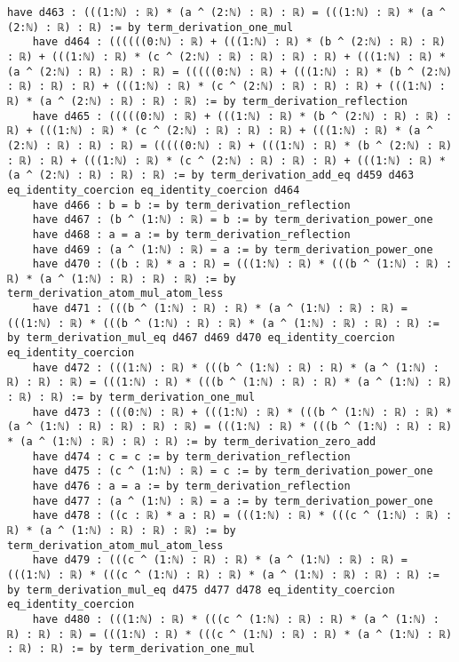\documentclass{article}
\begin{document}
\begin{tcolorbox}[colback=white!10, width=\linewidth]
\begin{lstlisting}[language=Lean4]
    have d463 : (((1:ℕ) : ℝ) * (a ^ (2:ℕ) : ℝ) : ℝ) = (((1:ℕ) : ℝ) * (a ^ (2:ℕ) : ℝ) : ℝ) := by term_derivation_one_mul
    have d464 : ((((((0:ℕ) : ℝ) + (((1:ℕ) : ℝ) * (b ^ (2:ℕ) : ℝ) : ℝ) : ℝ) + (((1:ℕ) : ℝ) * (c ^ (2:ℕ) : ℝ) : ℝ) : ℝ) : ℝ) + (((1:ℕ) : ℝ) * (a ^ (2:ℕ) : ℝ) : ℝ) : ℝ) = (((((0:ℕ) : ℝ) + (((1:ℕ) : ℝ) * (b ^ (2:ℕ) : ℝ) : ℝ) : ℝ) + (((1:ℕ) : ℝ) * (c ^ (2:ℕ) : ℝ) : ℝ) : ℝ) + (((1:ℕ) : ℝ) * (a ^ (2:ℕ) : ℝ) : ℝ) : ℝ) := by term_derivation_reflection
    have d465 : (((((0:ℕ) : ℝ) + (((1:ℕ) : ℝ) * (b ^ (2:ℕ) : ℝ) : ℝ) : ℝ) + (((1:ℕ) : ℝ) * (c ^ (2:ℕ) : ℝ) : ℝ) : ℝ) + (((1:ℕ) : ℝ) * (a ^ (2:ℕ) : ℝ) : ℝ) : ℝ) = (((((0:ℕ) : ℝ) + (((1:ℕ) : ℝ) * (b ^ (2:ℕ) : ℝ) : ℝ) : ℝ) + (((1:ℕ) : ℝ) * (c ^ (2:ℕ) : ℝ) : ℝ) : ℝ) + (((1:ℕ) : ℝ) * (a ^ (2:ℕ) : ℝ) : ℝ) : ℝ) := by term_derivation_add_eq d459 d463 eq_identity_coercion eq_identity_coercion d464
    have d466 : b = b := by term_derivation_reflection
    have d467 : (b ^ (1:ℕ) : ℝ) = b := by term_derivation_power_one
    have d468 : a = a := by term_derivation_reflection
    have d469 : (a ^ (1:ℕ) : ℝ) = a := by term_derivation_power_one
    have d470 : ((b : ℝ) * a : ℝ) = (((1:ℕ) : ℝ) * (((b ^ (1:ℕ) : ℝ) : ℝ) * (a ^ (1:ℕ) : ℝ) : ℝ) : ℝ) := by term_derivation_atom_mul_atom_less
    have d471 : (((b ^ (1:ℕ) : ℝ) : ℝ) * (a ^ (1:ℕ) : ℝ) : ℝ) = (((1:ℕ) : ℝ) * (((b ^ (1:ℕ) : ℝ) : ℝ) * (a ^ (1:ℕ) : ℝ) : ℝ) : ℝ) := by term_derivation_mul_eq d467 d469 d470 eq_identity_coercion eq_identity_coercion
    have d472 : (((1:ℕ) : ℝ) * (((b ^ (1:ℕ) : ℝ) : ℝ) * (a ^ (1:ℕ) : ℝ) : ℝ) : ℝ) = (((1:ℕ) : ℝ) * (((b ^ (1:ℕ) : ℝ) : ℝ) * (a ^ (1:ℕ) : ℝ) : ℝ) : ℝ) := by term_derivation_one_mul
    have d473 : (((0:ℕ) : ℝ) + (((1:ℕ) : ℝ) * (((b ^ (1:ℕ) : ℝ) : ℝ) * (a ^ (1:ℕ) : ℝ) : ℝ) : ℝ) : ℝ) = (((1:ℕ) : ℝ) * (((b ^ (1:ℕ) : ℝ) : ℝ) * (a ^ (1:ℕ) : ℝ) : ℝ) : ℝ) := by term_derivation_zero_add
    have d474 : c = c := by term_derivation_reflection
    have d475 : (c ^ (1:ℕ) : ℝ) = c := by term_derivation_power_one
    have d476 : a = a := by term_derivation_reflection
    have d477 : (a ^ (1:ℕ) : ℝ) = a := by term_derivation_power_one
    have d478 : ((c : ℝ) * a : ℝ) = (((1:ℕ) : ℝ) * (((c ^ (1:ℕ) : ℝ) : ℝ) * (a ^ (1:ℕ) : ℝ) : ℝ) : ℝ) := by term_derivation_atom_mul_atom_less
    have d479 : (((c ^ (1:ℕ) : ℝ) : ℝ) * (a ^ (1:ℕ) : ℝ) : ℝ) = (((1:ℕ) : ℝ) * (((c ^ (1:ℕ) : ℝ) : ℝ) * (a ^ (1:ℕ) : ℝ) : ℝ) : ℝ) := by term_derivation_mul_eq d475 d477 d478 eq_identity_coercion eq_identity_coercion
    have d480 : (((1:ℕ) : ℝ) * (((c ^ (1:ℕ) : ℝ) : ℝ) * (a ^ (1:ℕ) : ℝ) : ℝ) : ℝ) = (((1:ℕ) : ℝ) * (((c ^ (1:ℕ) : ℝ) : ℝ) * (a ^ (1:ℕ) : ℝ) : ℝ) : ℝ) := by term_derivation_one_mul

\end{lstlisting}
\end{tcolorbox}
\end{document}
